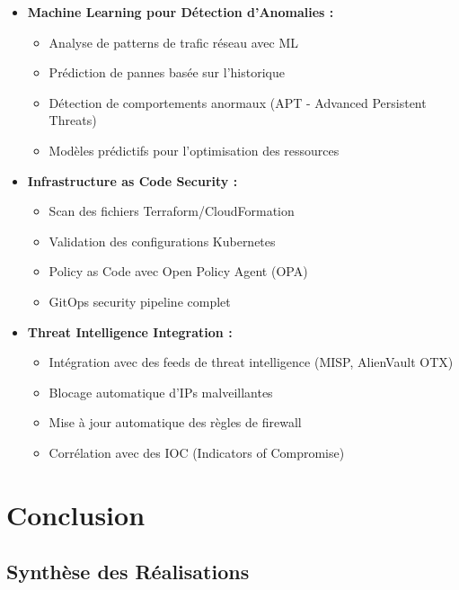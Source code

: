 \documentclass[11pt,a4paper]{report}
\begin{document}
\begin{itemize}
    \item \textbf{Machine Learning pour Détection d'Anomalies :}
    \begin{itemize}
        \item Analyse de patterns de trafic réseau avec ML
        \item Prédiction de pannes basée sur l'historique
        \item Détection de comportements anormaux (APT - Advanced Persistent Threats)
        \item Modèles prédictifs pour l'optimisation des ressources
    \end{itemize}
    
    \item \textbf{Infrastructure as Code Security :}
    \begin{itemize}
        \item Scan des fichiers Terraform/CloudFormation
        \item Validation des configurations Kubernetes
        \item Policy as Code avec Open Policy Agent (OPA)
        \item GitOps security pipeline complet
    \end{itemize}
    
    \item \textbf{Threat Intelligence Integration :}
    \begin{itemize}
        \item Intégration avec des feeds de threat intelligence (MISP, AlienVault OTX)
        \item Blocage automatique d'IPs malveillantes
        \item Mise à jour automatique des règles de firewall
        \item Corrélation avec des IOC (Indicators of Compromise)
    \end{itemize}
\end{itemize}


\chapter{Conclusion}

\section{Synthèse des Réalisations}
\end{document}
